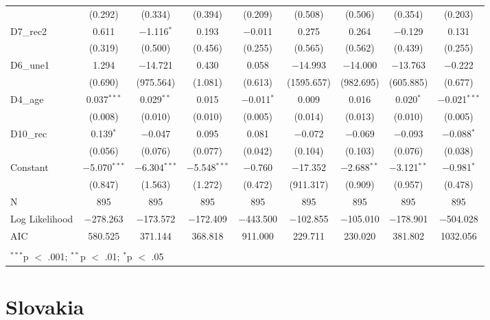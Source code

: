 \documentclass[
]{article}
\begin{document}
\begin{table}[!htbp]
\begin{tabular}{@{\extracolsep{0.5pt}}lcccccccc}
  & (0.292) & (0.334) & (0.394) & (0.209) & (0.508) & (0.506) & (0.354) & (0.203) \\ 
  D7\_rec2 & 0.611 & $-$1.116$^{*}$ & 0.193 & $-$0.011 & 0.275 & 0.264 & $-$0.129 & 0.131 \\ 
  & (0.319) & (0.500) & (0.456) & (0.255) & (0.565) & (0.562) & (0.439) & (0.255) \\ 
  D6\_une1 & 1.294 & $-$14.721 & 0.430 & 0.058 & $-$14.993 & $-$14.000 & $-$13.763 & $-$0.222 \\ 
  & (0.690) & (975.564) & (1.081) & (0.613) & (1595.657) & (982.695) & (605.885) & (0.677) \\ 
  D4\_age & 0.037$^{***}$ & 0.029$^{**}$ & 0.015 & $-$0.011$^{*}$ & 0.009 & 0.016 & 0.020$^{*}$ & $-$0.021$^{***}$ \\ 
  & (0.008) & (0.010) & (0.010) & (0.005) & (0.014) & (0.013) & (0.010) & (0.005) \\ 
  D10\_rec & 0.139$^{*}$ & $-$0.047 & 0.095 & 0.081 & $-$0.072 & $-$0.069 & $-$0.093 & $-$0.088$^{*}$ \\ 
  & (0.056) & (0.076) & (0.077) & (0.042) & (0.104) & (0.103) & (0.076) & (0.038) \\ 
  Constant & $-$5.070$^{***}$ & $-$6.304$^{***}$ & $-$5.548$^{***}$ & $-$0.760 & $-$17.352 & $-$2.688$^{**}$ & $-$3.121$^{**}$ & $-$0.981$^{*}$ \\ 
  & (0.847) & (1.563) & (1.272) & (0.472) & (911.317) & (0.909) & (0.957) & (0.478) \\ 
 N & 895 & 895 & 895 & 895 & 895 & 895 & 895 & 895 \\ 
Log Likelihood & $-$278.263 & $-$173.572 & $-$172.409 & $-$443.500 & $-$102.855 & $-$105.010 & $-$178.901 & $-$504.028 \\ 
AIC & 580.525 & 371.144 & 368.818 & 911.000 & 229.711 & 230.020 & 381.802 & 1032.056 \\ 
\hline \\[-1.8ex] 
\multicolumn{9}{l}{$^{***}$p $<$ .001; $^{**}$p $<$ .01; $^{*}$p $<$ .05} \\ 
\end{tabular} 
\end{table}

\clearpage

\newpage

\hypertarget{slovakia}{%
\section{Slovakia}\label{slovakia}}
\end{document}
